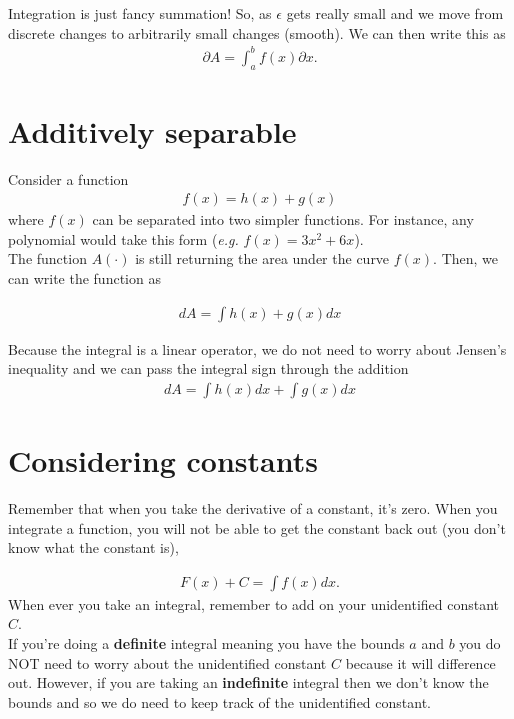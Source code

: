 \documentclass{article}
\begin{document}
Integration is just fancy summation! So, as $\epsilon$ gets really small and we move from discrete changes to arbitrarily small changes (smooth). We can then write this as 
\begin{align}
    \partial A =  \int_{a}^{b} f(x) \partial x.
\end{align}

\section{Additively separable}
Consider a function 
\begin{align}
    f(x) = h(x) + g(x)
\end{align}
where $f(x)$ can be separated into two simpler functions. For instance, any polynomial would take this form (\textit{e.g.} $f(x) = 3x^2 + 6x$). \\

The function $A(\cdot)$ is still returning the area under the curve $f(x)$. Then, we can write the function as 

\begin{align}
    dA = \int h(x) + g(x) dx
\end{align}

Because the integral is a linear operator, we do not need to worry about Jensen's inequality and we can pass the integral sign through the addition 
\begin{align}
    dA = \int h(x) dx + \int g(x) dx
\end{align}

\section{Considering constants}
Remember that when you take the derivative of a constant, it's zero. When you integrate a function, you will not be able to get the constant back out (you don't know what the constant is),

\begin{align}
    F(x) + C = \int f(x) dx.
\end{align}
When ever you take an integral, remember to add on your unidentified constant $C$. \\

If you're doing a \textbf{definite} integral meaning you have the bounds $a$ and $b$ you do NOT need to worry about the unidentified constant $C$ because it will difference out. However, if you are taking an \textbf{indefinite} integral then we don't know the bounds and so we do need to keep track of the unidentified constant.\\
\end{document}
